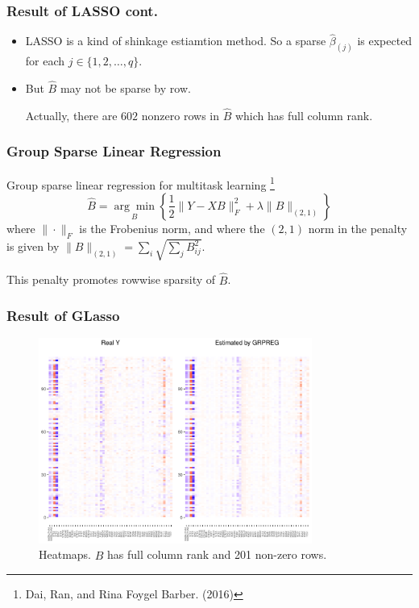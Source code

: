 \begin{frame}
    \frametitle{Result of LASSO cont.}
    \begin{itemize}
        \item LASSO is a kind of shinkage estiamtion method. 
        So a sparse $\hat{\beta}_{(j)}$ is expected for each $j\in\{ 1,2,\dots,q \}$. 

        \item But $\widehat{B}$ may not be sparse by row. 
        
        Actually, there are $602$ nonzero rows in $\widehat{B}$ which has full column rank. 
    \end{itemize}
\end{frame}

\begin{frame}\frametitle{Group Sparse Linear Regression}
    Group sparse linear regression for multitask learning \footnote[1]{Dai, Ran, and Rina Foygel Barber. (2016)}
    \begin{equation}
        \widehat{B}=\underset{B}{\arg \min }\left\{\frac{1}{2}\|Y-X B\|_{F}^{2}+\lambda\|B\|_{(2,1)}\right\}
    \end{equation}
    where $\|\cdot\|_{F}$ is the Frobenius norm,%
    and where the $(2,1)$ norm in the penalty is given by
    $\|B\|_{(2,1)} = \sum_i \sqrt{\sum_j B_{ij}^2}$.

    This penalty promotes rowwise sparsity of $\widehat{B}$.
\end{frame}

\begin{frame}
    \frametitle{Result of GLasso}
    \begin{figure}[h]
        \centering
        \includegraphics[width=0.8\textwidth]{./figs/heatmap_grpreg.pdf}
        \caption{Heatmaps. $\widehat{B}$ has full column rank and 201 non-zero rows.}
    \end{figure}
\end{frame}

